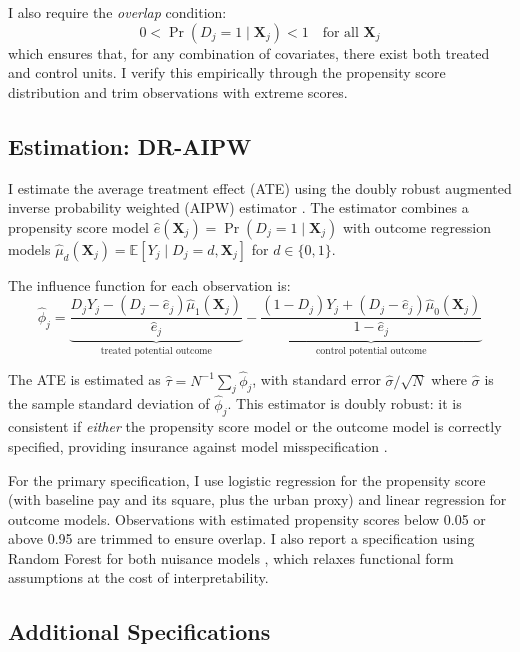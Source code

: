 \documentclass[12pt]{article}
\newcommand{\E}{\mathbb{E}}
\begin{document}
I also require the \textit{overlap} condition:
\begin{equation}
0 < \Pr(D_j = 1 \mid \mathbf{X}_j) < 1 \quad \text{for all } \mathbf{X}_j
\end{equation}
which ensures that, for any combination of covariates, there exist both treated and control units. I verify this empirically through the propensity score distribution and trim observations with extreme scores.

\subsection{Estimation: DR-AIPW}

I estimate the average treatment effect (ATE) using the doubly robust augmented inverse probability weighted (AIPW) estimator \citep{robins1994estimation}. The estimator combines a propensity score model $\hat{e}(\mathbf{X}_j) = \Pr(D_j = 1 \mid \mathbf{X}_j)$ with outcome regression models $\hat{\mu}_d(\mathbf{X}_j) = \E[Y_j \mid D_j = d, \mathbf{X}_j]$ for $d \in \{0,1\}$.

The influence function for each observation is:
\begin{equation}
\hat{\phi}_j = \underbrace{\frac{D_j Y_j - (D_j - \hat{e}_j)\hat{\mu}_1(\mathbf{X}_j)}{\hat{e}_j}}_{\text{treated potential outcome}} - \underbrace{\frac{(1-D_j) Y_j + (D_j - \hat{e}_j)\hat{\mu}_0(\mathbf{X}_j)}{1 - \hat{e}_j}}_{\text{control potential outcome}}
\end{equation}

The ATE is estimated as $\hat{\tau} = N^{-1} \sum_j \hat{\phi}_j$, with standard error $\hat{\sigma} / \sqrt{N}$ where $\hat{\sigma}$ is the sample standard deviation of $\hat{\phi}_j$. This estimator is doubly robust: it is consistent if \textit{either} the propensity score model or the outcome model is correctly specified, providing insurance against model misspecification \citep{heckman1998characterizing}.

For the primary specification, I use logistic regression for the propensity score (with baseline pay and its square, plus the urban proxy) and linear regression for outcome models. Observations with estimated propensity scores below 0.05 or above 0.95 are trimmed to ensure overlap. I also report a specification using Random Forest for both nuisance models \citep{breiman2001random}, which relaxes functional form assumptions at the cost of interpretability.

\subsection{Additional Specifications}
\end{document}
